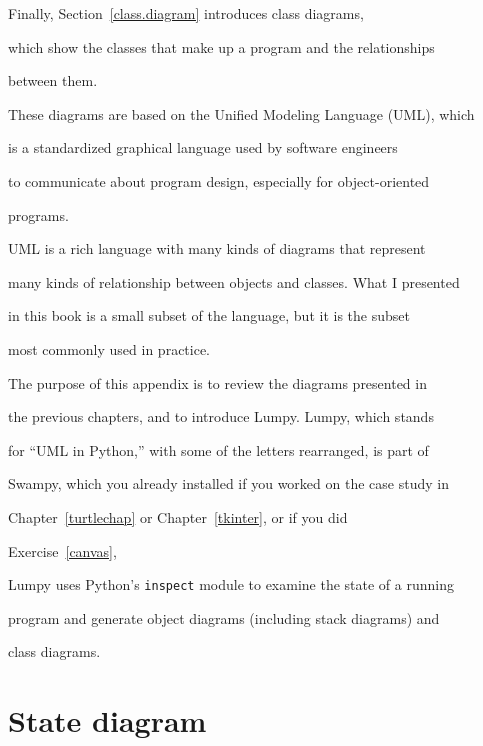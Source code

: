 Finally, Section~\ref{class.diagram} introduces class diagrams,

which show the classes that make up a program and the relationships

between them.





These diagrams are based on the Unified Modeling Language (UML), which

is a standardized graphical language used by software engineers

to communicate about program design, especially for object-oriented

programs.





UML is a rich language with many kinds of diagrams that represent

many kinds of relationship between objects and classes.  What I presented

in this book is a small subset of the language, but it is the subset

most commonly used in practice.



The purpose of this appendix is to review the diagrams presented in

the previous chapters, and to introduce Lumpy.  Lumpy, which stands

for ``UML in Python,'' with some of the letters rearranged, is part of

Swampy, which you already installed if you worked on the case study in

Chapter~\ref{turtlechap} or Chapter~\ref{tkinter}, or if you did

Exercise~\ref{canvas},





Lumpy uses Python's {\tt inspect} module to examine the state of a running

program and generate object diagrams (including stack diagrams) and

class diagrams.



\section{State diagram}



